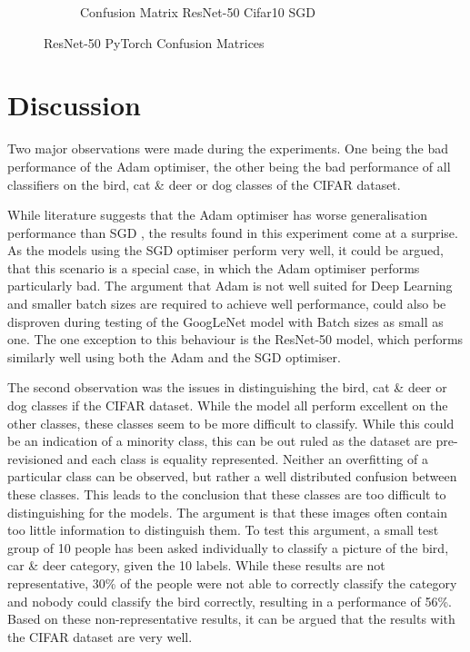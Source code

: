\documentclass[conference]{IEEEtran}
\begin{document}
\begin{figure}[!htbp]
\begin{subfigure}[b]{0.22\textwidth}
        \caption{Confusion Matrix ResNet-50 Cifar10 SGD}
        \label{fig:x matrix_ResNet_CIFAR_SGD}
    \end{subfigure}
    \caption{ResNet-50 PyTorch Confusion Matrices}
    \label{fig:ResNet Confusion Matrixis}
\end{figure}

\section{Discussion}\label{C5}
Two major observations were made during the experiments. 
One being the bad performance of the Adam optimiser, the other being the bad performance of all classifiers on the bird, cat \& deer or dog classes of the CIFAR dataset.

While literature suggests that the Adam optimiser has worse generalisation performance than SGD \cite{gupta_adam_nodate}, the results found in this experiment come at a surprise.
As the models using the SGD optimiser perform very well, it could be argued, that this scenario is a special case, in which the Adam optimiser performs particularly bad.
The argument that Adam is not well suited for Deep Learning and smaller batch sizes are required to achieve well performance, could also be disproven during testing of the GoogLeNet model with Batch sizes as small as one.
The one exception to this behaviour is the ResNet-50 model, which performs similarly well using both the Adam and the SGD optimiser.

The second observation was the issues in distinguishing the bird, cat \& deer or dog classes if the CIFAR dataset. 
While the model all perform excellent on the other classes, these classes seem to be more difficult to classify.
While this could be an indication of a minority class, this can be out ruled as the dataset are pre-revisioned and each class is equality represented.
Neither an overfitting of a particular class can be observed, but rather a well distributed confusion between these classes.
This leads to the conclusion that these classes are too difficult to distinguishing for the models. 
The argument is that these images often contain too little information to distinguish them. 
To test this argument, a small test group of 10 people has been asked individually to classify a picture of the bird, car \& deer category, given the 10 labels.
While these results are not representative, 30\% of the people were not able to correctly classify the category and nobody could classify the bird correctly, resulting in a performance of 56\%.
Based on these non-representative results, it can be argued that the results with the CIFAR dataset are very well.
\end{document}
